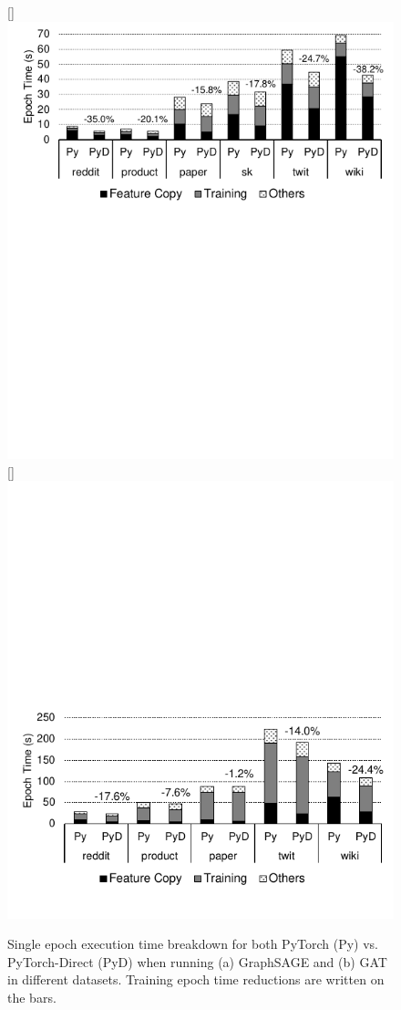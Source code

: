\begin{figure}[!htbp]\captionsetup[subfigure]{font=small}
\centering
{}
[\linewidth]{\includegraphics[scale=1.2]{figures/PyDArXiv/combined_perf_graphsage.pdf}}
[\linewidth]{\includegraphics[scale=1.2]{figures/PyDArXiv/combined_perf_gat.pdf}}
\caption{\label{fig:graphsage} Single epoch execution time breakdown for both PyTorch (Py) vs. PyTorch-Direct (PyD) when running (a) GraphSAGE and (b) GAT in different datasets. Training epoch time reductions are written on the bars.}
\end{figure}


